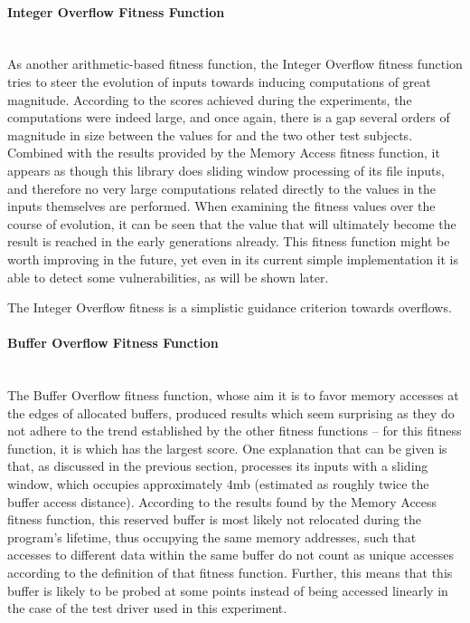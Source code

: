 \paragraph{Integer Overflow Fitness Function} ~\\
As another arithmetic-based fitness function, the Integer Overflow fitness function tries to steer the
evolution of inputs towards inducing computations of great magnitude. According to the scores achieved during
the experiments, the computations were indeed large, and once again, there is a gap several orders of
magnitude in size between the values for \libpcap and the two other test subjects. Combined with the
results provided by the Memory Access fitness function, it appears as though this library does sliding window
processing of its file inputs, and therefore no very large computations related directly to the values in
the inputs themselves are performed. When examining the fitness values over the course of evolution, it can
be seen that the value that will ultimately become the result is reached in the early generations already.
This fitness function might be worth improving in the future, yet even in its current simple
implementation it is able to detect some vulnerabilities, as will be shown later.

\begin{mdframed}
\centering
The Integer Overflow fitness is a simplistic guidance criterion towards overflows.
\end{mdframed}

\paragraph{Buffer Overflow Fitness Function} ~\\
The Buffer Overflow fitness function, whose aim it is to favor memory accesses at the edges of allocated
buffers, produced results which seem surprising as they do not adhere to the trend established by the other
fitness functions -- for this fitness function, it is \libpcap which has the largest score. One explanation
that can be given is that, as discussed in the previous section, \libpcap processes its inputs with a sliding
window, which occupies approximately 4mb (estimated as roughly twice the buffer access distance). 
According to the results found by the Memory Access fitness function, this reserved buffer is most likely not
relocated during the program's lifetime, thus occupying the same memory addresses, such that accesses to
different data within the same buffer do not count as unique accesses according to the definition of that
fitness function. Further, this means that this buffer is likely to be probed at some points instead of being
accessed linearly in the case of the test driver used in this experiment. 

